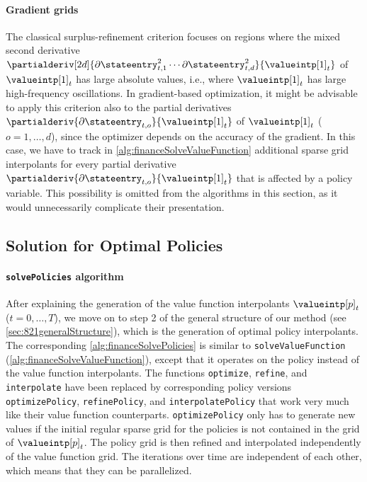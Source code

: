 \paragraph{Gradient grids}

The classical surplus-refinement criterion focuses on
regions where the mixed second derivative
$\partialderiv[2d]{
  \partialdiff \stateentry_{t,1}^2 \dotsm \partialdiff \stateentry_{t,d}^2
}{
  \valueintp[1]_t
}$
of $\valueintp[1]_t$ has large absolute values, i.e.,
where $\valueintp[1]_t$ has large high-frequency oscillations.
In gradient-based optimization,
it might be advisable to apply this criterion also
to the partial derivatives
$\partialderiv{\partialdiff \stateentry_{t,o}}{\valueintp[1]_t}$
of $\valueintp[1]_t$ ($o = 1, \dotsc, d$),
since the optimizer depends on the accuracy of the gradient.
In this case, we have to track in \cref{alg:financeSolveValueFunction}
additional sparse grid interpolants for every partial derivative
$\partialderiv{\partialdiff \stateentry_{t,o}}{\valueintp[1]_t}$
that is affected by a policy variable.
This possibility is omitted from the algorithms in this section,
as it would unnecessarily complicate their presentation.



\subsection{Solution for Optimal Policies}
\label{sec:827solvePolicies}

\paragraph{\texttt{solvePolicies} algorithm}

After explaining the generation of the value function interpolants
$\valueintp[p]_t$ ($t = 0, \dotsc, T$),
we move on to step 2 of the general structure of our method
(see \cref{sec:821generalStructure}),
which is the generation of optimal policy interpolants.
The corresponding \cref{alg:financeSolvePolicies} is similar to
\texttt{solveValueFunction} (\cref{alg:financeSolveValueFunction}),
except that it operates on the policy instead of
the value function interpolants.
The functions \texttt{optimize}, \texttt{refine}, and \texttt{interpolate}
have been replaced by corresponding policy versions
\texttt{optimizePolicy}, \texttt{refinePolicy}, and \texttt{interpolatePolicy}
that work very much like their value function counterparts.
\texttt{optimizePolicy} only has to generate new values
if the initial regular sparse grid for the policies
is not contained in the grid of $\valueintp[p]_t$.
The policy grid is then refined and interpolated independently
of the value function grid.
The iterations over time are independent of each other,
which means that they can be parallelized.

